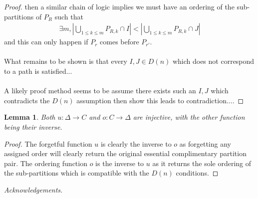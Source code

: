 \documentclass[11pt]{amsart}
\newtheorem{lemma}[thm]{Lemma}
\theoremstyle{definition}
\theoremstyle{remark}
\numberwithin{equation}{section}
\newcommand{\EC}{C}
\newcommand{\OP}{\Delta}
\newcommand{\0}{\color{blue}{\mathsf{0}}}
\begin{document}
\begin{proof}
then a similar chain of logic implies we must have an ordering of the sub-partitions of $P_R$ such that
\begin{align*}
    \exists m, |\bigcup_{1\leq k \leq m} P_{R,k} \cap I| < |\bigcup_{1\leq k \leq m} P_{R,k} \cap J|
\end{align*}
and this can only happen if $P_r$ comes before $P_{r'}$.
\\\\
What remains to be shown is that every $I,J \in D(n)$ which does not correspond to a path is satisfied... 
\\\\
A likely proof method seems to be assume there exists such an $I,J$ which contradicts the $D(n)$ assumption then show this leads to contradiction....
\end{proof}

\begin{lemma} \label{o and u are injective}
Both $u:\OP \to \EC$ and $o:\EC\to \OP$ are injective, with the other function being their inverse.
\end{lemma}
\begin{proof}
The forgetful function $u$ is clearly the inverse to $o$ as forgetting any assigned order will clearly return the original essential complimentary partition pair. The ordering function $o$ is the inverse to $u$ as it returns the sole ordering of the sub-partitions which is compatible with the $D(n)$ conditions.
\end{proof}

\emph{Acknowledgements.}    




\end{document}
